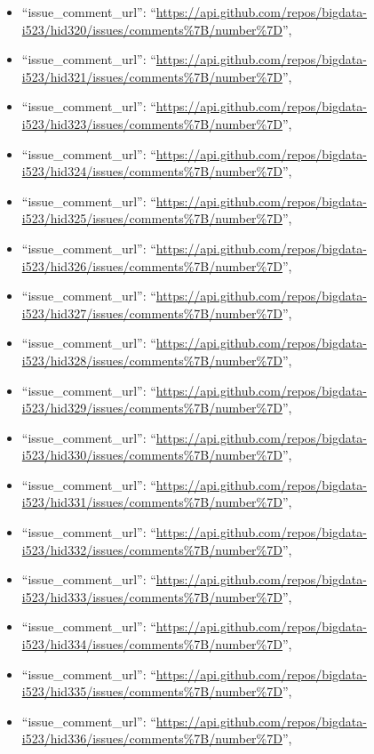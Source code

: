 \begin{itemize}
\item
  ``issue\_comment\_url'':
  ``\url{https://api.github.com/repos/bigdata-i523/hid320/issues/comments\%7B/number\%7D}'',
\item
  ``issue\_comment\_url'':
  ``\url{https://api.github.com/repos/bigdata-i523/hid321/issues/comments\%7B/number\%7D}'',
\item
  ``issue\_comment\_url'':
  ``\url{https://api.github.com/repos/bigdata-i523/hid323/issues/comments\%7B/number\%7D}'',
\item
  ``issue\_comment\_url'':
  ``\url{https://api.github.com/repos/bigdata-i523/hid324/issues/comments\%7B/number\%7D}'',
\item
  ``issue\_comment\_url'':
  ``\url{https://api.github.com/repos/bigdata-i523/hid325/issues/comments\%7B/number\%7D}'',
\item
  ``issue\_comment\_url'':
  ``\url{https://api.github.com/repos/bigdata-i523/hid326/issues/comments\%7B/number\%7D}'',
\item
  ``issue\_comment\_url'':
  ``\url{https://api.github.com/repos/bigdata-i523/hid327/issues/comments\%7B/number\%7D}'',
\item
  ``issue\_comment\_url'':
  ``\url{https://api.github.com/repos/bigdata-i523/hid328/issues/comments\%7B/number\%7D}'',
\item
  ``issue\_comment\_url'':
  ``\url{https://api.github.com/repos/bigdata-i523/hid329/issues/comments\%7B/number\%7D}'',
\item
  ``issue\_comment\_url'':
  ``\url{https://api.github.com/repos/bigdata-i523/hid330/issues/comments\%7B/number\%7D}'',
\item
  ``issue\_comment\_url'':
  ``\url{https://api.github.com/repos/bigdata-i523/hid331/issues/comments\%7B/number\%7D}'',
\item
  ``issue\_comment\_url'':
  ``\url{https://api.github.com/repos/bigdata-i523/hid332/issues/comments\%7B/number\%7D}'',
\item
  ``issue\_comment\_url'':
  ``\url{https://api.github.com/repos/bigdata-i523/hid333/issues/comments\%7B/number\%7D}'',
\item
  ``issue\_comment\_url'':
  ``\url{https://api.github.com/repos/bigdata-i523/hid334/issues/comments\%7B/number\%7D}'',
\item
  ``issue\_comment\_url'':
  ``\url{https://api.github.com/repos/bigdata-i523/hid335/issues/comments\%7B/number\%7D}'',
\item
  ``issue\_comment\_url'':
  ``\url{https://api.github.com/repos/bigdata-i523/hid336/issues/comments\%7B/number\%7D}'',

\end{itemize}
